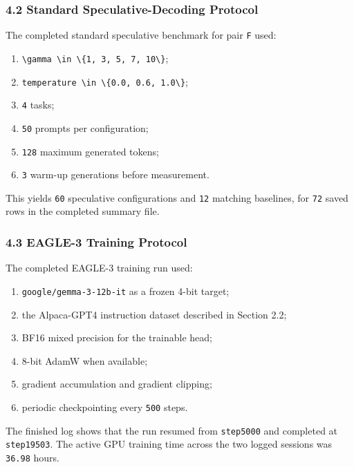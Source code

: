 \documentclass[
]{article}
\begin{document}
\subsubsection{4.2 Standard Speculative-Decoding
Protocol}\label{42-standard-speculative-decoding-protocol}

The completed standard speculative benchmark for pair \texttt{F} used:

\begin{enumerate}
\def\labelenumi{\arabic{enumi}.}
\item
  \texttt{\textbackslash{}gamma\ \textbackslash{}in\ \textbackslash{}\{1,\ 3,\ 5,\ 7,\ 10\textbackslash{}\}};
\item
  \texttt{temperature\ \textbackslash{}in\ \textbackslash{}\{0.0,\ 0.6,\ 1.0\textbackslash{}\}};
\item
  \texttt{4} tasks;
\item
  \texttt{50} prompts per configuration;
\item
  \texttt{128} maximum generated tokens;
\item
  \texttt{3} warm-up generations before measurement.
\end{enumerate}

This yields \texttt{60} speculative configurations and \texttt{12}
matching baselines, for \texttt{72} saved rows in the completed summary
file.

\subsubsection{4.3 EAGLE-3 Training
Protocol}\label{43-eagle-3-training-protocol}

The completed EAGLE-3 training run used:

\begin{enumerate}
\def\labelenumi{\arabic{enumi}.}
\item
  \texttt{google/gemma-3-12b-it} as a frozen 4-bit target;
\item
  the Alpaca-GPT4 instruction dataset described in Section 2.2;
\item
  BF16 mixed precision for the trainable head;
\item
  8-bit AdamW when available;
\item
  gradient accumulation and gradient clipping;
\item
  periodic checkpointing every \texttt{500} steps.
\end{enumerate}

The finished log shows that the run resumed from \texttt{step5000} and
completed at \texttt{step19503}. The active GPU training time across the
two logged sessions was \texttt{36.98} hours.
\end{document}
